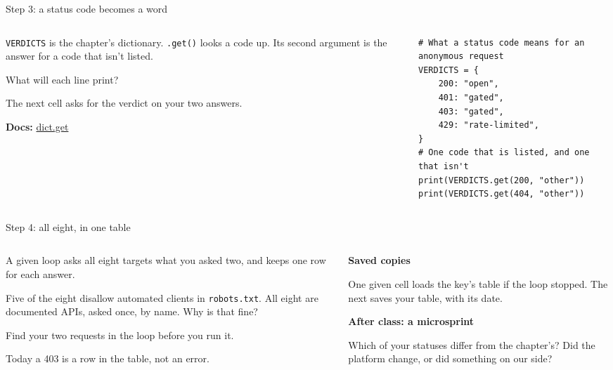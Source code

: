 \documentclass[9pt,aspectratio=169]{beamer}
\begin{document}
\begin{frame}[fragile]{Step 3: a status code becomes a word}
    \begin{columns}[T]
        \begin{column}{0.37\textwidth}
            \texttt{VERDICTS} is the chapter's dictionary. \texttt{.get()} looks a code up. Its second argument is the answer for a code that isn't listed.

            \medskip
            What will each line print?

            \medskip
            The next cell asks for the verdict on your two answers.

            \medskip
            {\scriptsize\textbf{Docs:} \href{https://docs.python.org/3/library/stdtypes.html\#dict.get}{dict.get}\par}
        \end{column}
        \begin{column}{0.6\textwidth}
\begin{lstlisting}[basicstyle=\ttfamily\footnotesize]
# What a status code means for an anonymous request
VERDICTS = {
    200: "open",
    401: "gated",
    403: "gated",
    429: "rate-limited",
}
# One code that is listed, and one that isn't
print(VERDICTS.get(200, "other"))
print(VERDICTS.get(404, "other"))
\end{lstlisting}
        \end{column}
    \end{columns}
\end{frame}

\begin{frame}{Step 4: all eight, in one table}
    \begin{columns}[T]
        \begin{column}{0.6\textwidth}
            A given loop asks all eight targets what you asked two, and keeps one row for each answer.

            \medskip
            Five of the eight disallow automated clients in \texttt{robots.txt}. All eight are documented APIs, asked once, by name. Why is that fine?

            \medskip
            Find your two requests in the loop before you run it.

            \medskip
            Today a 403 is a row in the table, not an error.
        \end{column}
        \begin{column}{0.35\textwidth}
            \textbf{Saved copies}\\[2pt]
            {\footnotesize One given cell loads the key's table if the loop stopped. The next saves your table, with its date.\par}
            \medskip
            \textbf{After class: a microsprint}\\[2pt]
            {\footnotesize Which of your statuses differ from the chapter's? Did the platform change, or did something on our side?\par}
        \end{column}
    \end{columns}
\end{frame}
\end{document}
